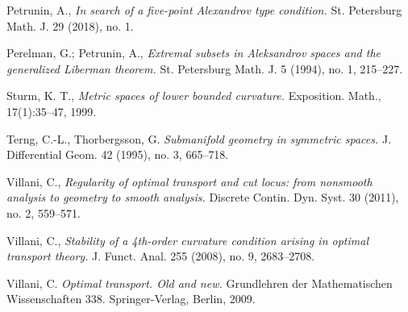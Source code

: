 \documentclass{article}
\begin{document}
\begin{thebibliography}{52}
 Petrunin, A., \emph{In search of a five-point Alexandrov type condition.}  St. Petersburg Math. J. 29 (2018), no. 1.

 Perelman, G.; Petrunin, A., \emph{Extremal subsets in Aleksandrov spaces and the generalized Liberman theorem.} St. Petersburg Math. J. 5 (1994), no. 1, 215--227.


  Sturm, K. T., \emph{Metric spaces of lower bounded curvature.} Exposition. Math., 17(1):35–47, 1999.


  Terng, C.-L.,  Thorbergsson, G.
\emph{Submanifold geometry in symmetric spaces.} J. Differential Geom. 42 (1995), no. 3, 665--718.

 Villani, C., \emph{Regularity of optimal transport and cut locus: from nonsmooth analysis to geometry to smooth analysis.} Discrete Contin. Dyn. Syst. 30 (2011), no. 2, 559–571. 
 
 Villani, C., \emph{Stability of a 4th-order curvature condition arising in optimal transport theory.}
J. Funct. Anal. 255 (2008), no. 9, 2683--2708.

 
  Villani, C. \emph{Optimal transport. Old and new.} Grundlehren der Mathematischen Wissenschaften 338. Springer-Verlag, Berlin, 2009.
\end{thebibliography}


%
\Addresses
\end{document}
